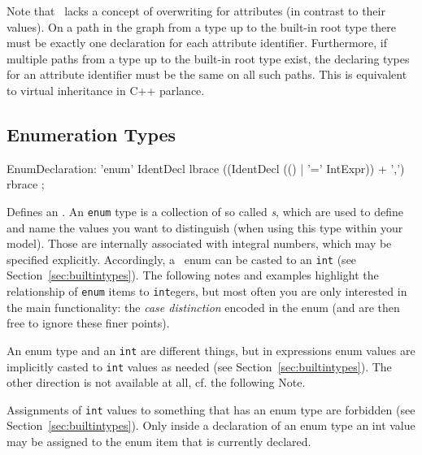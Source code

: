 Note that \GrG\ lacks a concept of overwriting for attributes (in contrast to their values).
On a path in the  graph from a type up to the built-in root type there must be exactly one declaration for each attribute identifier. Furthermore, if multiple paths from a type up to the built-in root type exist, the declaring types for an attribute identifier must be the same on all such paths.
This is equivalent to virtual inheritance in C++ parlance.

\pagebreak

\subsection{Enumeration Types}
\label{sct:enumtypes}
\begin{rail}
  EnumDeclaration: 'enum' IdentDecl lbrace ((IdentDecl (() | '=' IntExpr)) + ',') rbrace ;
\end{rail}
Defines an .
An \texttt{enum} type is a collection of so called \emph{s}, which are used to define and name the values you want to distinguish (when using this type within your model). 
Those are internally associated with integral numbers, which may be specified explicitly.
Accordingly, a \GrG\ enum can be casted to an \texttt{int} (see Section~\ref{sec:builtintypes}).
The following notes and examples highlight the relationship of \texttt{enum} items to \texttt{int}egers, but most often you are only interested in the main functionality: the \emph{case distinction} encoded in the enum (and are then free to ignore these finer points). 

\begin{note}
	An enum type and an {\tt int} are different things, but in expressions enum values are implicitly casted to {\tt int} values as needed (see Section~\ref{sec:builtintypes}). The other direction is not available at all, cf. the following Note.
\end{note}

\begin{warning}
	Assignments of {\tt int} values to something that has an enum type are forbidden (see Section~\ref{sec:builtintypes}).
	Only inside a declaration of an enum type an int value may be assigned to the enum item that is currently declared.
\end{warning}

